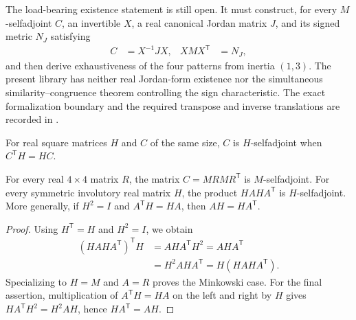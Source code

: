 The load-bearing existence statement is still open.  It must construct, for
every $M$-selfadjoint $C$, an invertible $X$, a real canonical Jordan matrix
$J$, and its signed metric $N_J$ satisfying
\begin{align}
    C&=X^{-1}JX,
    &XMX^{\mathsf T}&=N_J,
\end{align}
and then derive exhaustiveness of the four patterns from inertia $(1,3)$.
The present library has neither real Jordan-form existence nor the simultaneous
similarity--congruence theorem controlling the sign characteristic.  The exact
formalization boundary and the required transpose and inverse translations are
recorded in \cite{gap:qiclean_minkowski_canonical_pair_dependency}.

For real square matrices $H$ and $C$ of the same size, $C$ is
$H$-selfadjoint when $C^{\mathsf T}H=HC$.

\begin{theorem}
    \label{thm:minkowski_gram_selfadjoint}
    \leanok
    For every real $4\times4$ matrix $R$, the matrix $C=MRMR^{\mathsf T}$
    is $M$-selfadjoint. For every symmetric involutory real matrix $H$,
    the product $HAHA^{\mathsf T}$ is $H$-selfadjoint.
    More generally, if $H^2=I$ and
    $A^{\mathsf T}H=HA$, then $AH=HA^{\mathsf T}$.
\end{theorem}
\begin{proof}\leanok
    Using $H^{\mathsf T}=H$ and $H^2=I$, we obtain
    \begin{align*}
        (HAHA^{\mathsf T})^{\mathsf T}H
        &=AHA^{\mathsf T}H^2=AHA^{\mathsf T}\\
        &=H^2AHA^{\mathsf T}=H(HAHA^{\mathsf T}).
    \end{align*}
    Specializing to $H=M$ and $A=R$ proves the Minkowski case.
    For the final assertion, multiplication of $A^{\mathsf T}H=HA$
    on the left and right by $H$ gives
    $HA^{\mathsf T}H^2=H^2AH$, hence $HA^{\mathsf T}=AH$.
\end{proof}

